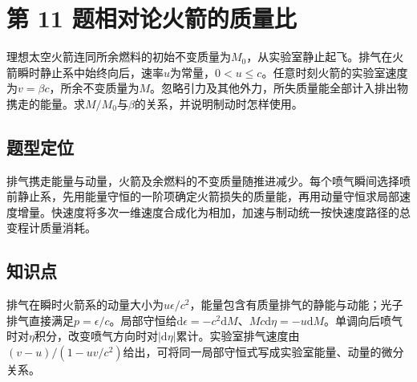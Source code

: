 \documentclass[UTF8,fontset=fandol,a4paper,11pt]{ctexart}
\newcommand{\figcaption}[1]{\par\vspace{2pt}{\small\color{muted}#1}\par}
\begin{document}
\section*{第 11 题\quad 相对论火箭的质量比}\label{q:11}

理想太空火箭连同所余燃料的初始不变质量为$M_0$，从实验室静止起飞。排气在火箭瞬时静止系中始终向后，速率$u$为常量，$0<u\le c$。任意时刻火箭的实验室速度为$v=\beta c$，所余不变质量为$M$。忽略引力及其他外力，所失质量能全部计入排出物携走的能量。求$M/M_0$与$\beta$的关系，并说明制动时怎样使用。

\begin{center}\begin{minipage}{.98\linewidth}\centering
{}
\figcaption{图近2.11\quad 排气速率在船的瞬时静止系定义。}
\end{minipage}\end{center}



\subsection*{题型定位}

排气携走能量与动量，火箭及余燃料的不变质量随推进减少。每个喷气瞬间选择喷前静止系，先用能量守恒的一阶项确定火箭损失的质量能，再用动量守恒求局部速度增量。快速度将多次一维速度合成化为相加，加速与制动统一按快速度路径的总变程计质量消耗。



\subsection*{知识点}

排气在瞬时火箭系的动量大小为$u\epsilon/c^2$，能量包含有质量排气的静能与动能；光子排气直接满足$p=\epsilon/c$。局部守恒给$\mathrm d\epsilon=-c^2\mathrm dM$、$Mc\mathrm d\eta=-u\mathrm dM$。单调向后喷气时对$\eta$积分，改变喷气方向时对$|\mathrm d\eta|$累计。实验室排气速度由$(v-u)/(1-uv/c^2)$给出，可将同一局部守恒式写成实验室能量、动量的微分关系。
\end{document}
